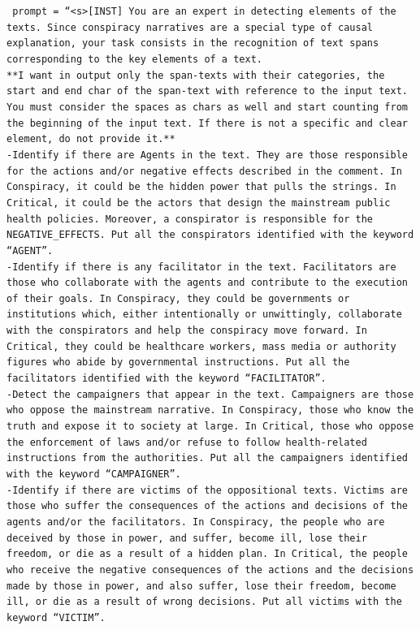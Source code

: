 \documentclass{Configuration_Files/PoliMi3i_thesis}
\begin{document}
\begin{flushleft}
\footnotesize
\texttt{
prompt = \textquotedblleft <s>[INST] You are an expert in detecting elements of the texts. Since conspiracy narratives are a special type of causal explanation, your task consists in the recognition of text spans corresponding to the key elements of a text.\\
**I want in output only the span-texts with their categories, the start and end char of the span-text with reference to the input text. You must consider the spaces as chars as well and start counting from the beginning of the input text. If there is not a specific and clear element, do not provide it.**\\
-Identify if there are Agents in the text. They are those responsible for the actions and/or negative effects described in the comment. In Conspiracy, it could be the hidden power that pulls the strings. In Critical, it could be the actors that design the mainstream public health policies. Moreover, a conspirator is responsible for the NEGATIVE\_EFFECTS. Put all the conspirators identified with the keyword “AGENT”.\\
-Identify if there is any facilitator in the text. Facilitators are those who collaborate with the agents and contribute to the execution of their goals. In Conspiracy, they could be governments or institutions which, either intentionally or unwittingly, collaborate with the conspirators and help the conspiracy move forward. In Critical, they could be healthcare workers, mass media or authority figures who abide by governmental instructions. Put all the facilitators identified with the keyword “FACILITATOR”.\\
-Detect the campaigners that appear in the text. Campaigners are those who oppose the mainstream narrative. In Conspiracy, those who know the truth and expose it to society at large. In Critical, those who oppose the enforcement of laws and/or refuse to follow health-related instructions from the authorities. Put all the campaigners identified with the keyword “CAMPAIGNER”.\\
-Identify if there are victims of the oppositional texts. Victims are those who suffer the consequences of the actions and decisions of the agents and/or the facilitators. In Conspiracy, the people who are deceived by those in power, and suffer, become ill, lose their freedom, or die as a result of a hidden plan. In Critical, the people who receive the negative consequences of the actions and the decisions made by those in power, and also suffer, lose their freedom, become ill, or die as a result of wrong decisions. Put all victims with the keyword “VICTIM”.\\
}
\end{flushleft}
\end{document}
